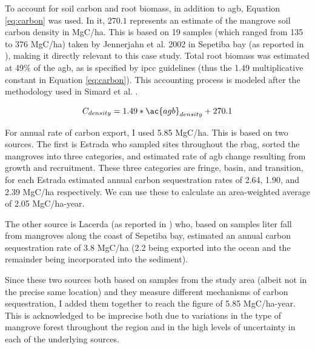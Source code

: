 To account for soil carbon and root biomass, in addition to \ac{agb}, Equation \ref{eq:carbon} was used. In it, $270.1$ represents an estimate of the mangrove soil carbon density in MgC/ha. This is based on 19 samples (which ranged from 135 to 376 MgC/ha) taken by Jennerjahn et al. 2002 \cite{jennerjahnRelevanceMangrovesProduction2002} in Sepetiba bay (as reported in \cite{kristensenOrganicCarbonDynamics2008, atwoodGlobalPatternsMangrove2017}), making it directly relevant to this case study.  Total root biomass was estimated at 49\% of the \ac{agb}, as is specified by \ac{ipcc} guidelines \cite{takahiko2013Supplement20062014} (thus the 1.49 multiplicative constant in Equation \ref{eq:carbon}). This accounting process is modeled after the methodology used in Simard et al. \cite{simardMangroveCanopyHeight2019}.

\begin{equation}
\label{eq:carbon}
C_{density} = 1.49 * \ac{agb}_{density} + 270.1 
\end{equation}

For annual rate of carbon export, I used 5.85 MgC/ha. This is based on two sources. The first is Estrada \cite{estrada2013analise} who sampled sites throughout the \ac{rbag}, sorted the mangroves into three categories, and estimated rate of \ac{agb} change resulting from growth and recruitment. These three categories are fringe, basin, and transition, for each Estrada estimated annual carbon sequestration rates of 2.64, 1.90, and 2.39 MgC/ha respectively. We can use these to calculate an area-weighted average of 2.05 MgC/ha-year. 

The other source is Lacerda \cite{lacerda1992carbon} (as reported in \cite{jennerjahnRelevanceMangrovesProduction2002}) who, based on samples liter fall from mangroves along the coast of Sepetiba bay, estimated an annual carbon sequestration rate of 3.8 MgC/ha (2.2 being exported into the ocean and the remainder being incorporated into the sediment).

Since these two sources both based on samples from the study area (albeit not in the precise same location) and they measure different mechanisms of carbon sequestration, I added them together to reach the figure of 5.85 MgC/ha-year. This is acknowledged to be imprecise both due to variations in the type of mangrove forest throughout the region and in the high levels of uncertainty in each of the underlying sources.

\subsubsection{} \label{sec:rio-vulnerability}

